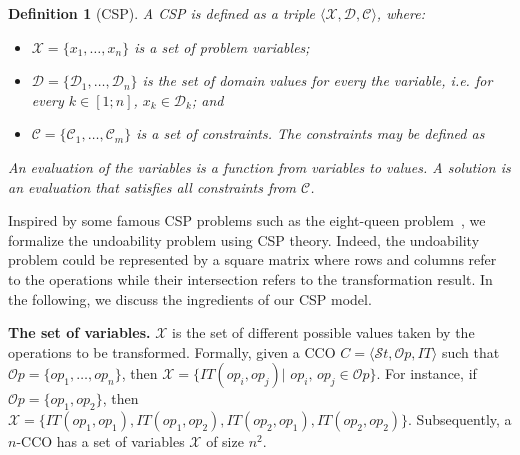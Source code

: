 \documentclass[submission,copyright,creativecommons]{eptcs}
\newtheorem{definition}{Definition}
\begin{document}
\begin{definition}[CSP]\label{def:csp}
A CSP is defined as a triple $\langle \mathcal{X},\mathcal{D},\mathcal{C} \rangle$, where:
\begin{itemize}
\item $\mathcal{X}=\{x_1,\ldots,x_n\}$ is a set of problem variables; \vspace{-1.5mm}
\item  $\mathcal{D}=\{\mathcal{D}_1,\ldots, \mathcal{D}_n\}$ is the set of   domain values for every the variable, \textit{i.e.} for every $k\in [1;n]$, $x_k \in \mathcal{D}_k$; and\vspace{-1.5mm} 
\item  $\mathcal{C}=\{\mathcal{C}_1,\ldots, \mathcal{C}_m\}$ is a set of constraints. The  constraints may  be defined as    
\end{itemize} 
An evaluation of the variables is a function from variables to values. A solution is an evaluation that satisfies all constraints from $\mathcal{C}$.

\end{definition}





Inspired by some famous CSP problems such as the eight-queen problem~\cite{NQueen,Bell20091}, we  formalize the  undoability problem  using CSP theory. Indeed, the undoability problem could be represented by  a square matrix where rows and columns refer to the operations  while their intersection  refers to the transformation result. 
In the following,  we discuss the ingredients of our  CSP model.

\medskip
\noindent\textbf{\textbf{The set of variables.}}
 $\mathcal{X}$ is the set of different possible  values taken by the operations to be transformed. Formally, given a CCO $C=\langle\mathcal{S}t,\mathcal{O}p,IT\rangle$ such that $\mathcal{O}p=\{op_1,\ldots,op_n\}$, then  $\mathcal{X}=\{IT(op_i,op_j)|$ $ op_i,\,op_j\in \mathcal{O}p \}$. For instance, if $\mathcal{O}p=\{op_1,op_2\}$, then $\mathcal{X}=\{IT(op_1,op_1), IT(op_1,op_2), IT(op_2,op_1), IT(op_2,op_2)\}$. Subsequently, a $n$-CCO has a set of variables  $\mathcal{X}$ of size  $n^2$.
\end{document}
